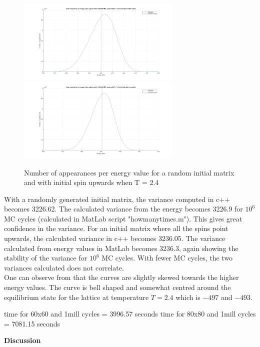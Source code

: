 \documentclass[10pt,a4paper]{article}
\begin{document}
\begin{figure}[H]
\centerline{
\includegraphics[width=0.7\textwidth]{energyappearanceT24random}
\includegraphics[width=0.7\textwidth]{energyappearanceT24upspin}
}
\caption{Number of appearances per energy value for a random initial matrix and with initial spin upwards when T = 2.4}
\label{fig:energyappearance}
\end{figure}

\noindent With a randomly generated initial matrix, the variance computed in c++ becomes 3226.62. The calculated variance from the energy becomes 3226.9 for $10^6$ MC cycles (calculated in MatLab script "howmanytimes.m"). This gives great confidence in the variance. For an initial matrix where all the spins point upwards, the calculated variance in c++ becomes 3236.05. The variance calculated from energy values in MatLab becomes 3236.3, again showing the stability of the variance for $10^6$ MC cycles. With fewer MC cycles, the two variances calculated does not correlate.
\\
One can observe from  that the curves are slightly skewed towards the higher energy values. The curve is bell shaped and somewhat centred around the equilibrium state for the lattice at temperature $T = 2.4$ which is $-497$ and $-493$. 

\noindent time for 60x60 and 1mill cycles = 3996.57 seconds
\noindent time for 80x80 and 1mill cycles = 7081.15 seconds

\newpage

\begin{center}
{\LARGE\bf Discussion}
\end{center}
\end{document}
